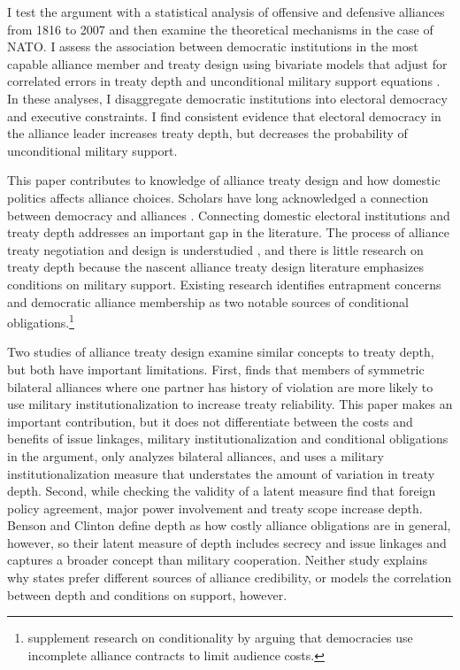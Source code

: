 \documentclass[12pt]{article}
\begin{document}
I test the argument with a statistical analysis of offensive and defensive alliances from 1816 to 2007 and then examine the theoretical mechanisms in the case of NATO.
I assess the association between democratic institutions in the most capable alliance member and treaty design using bivariate models that adjust for correlated errors in treaty depth and unconditional military support equations \citep{Braumoelleretal2018}. 
In these analyses, I disaggregate democratic institutions into electoral democracy and executive constraints.
I find consistent evidence that electoral democracy in the alliance leader increases treaty depth, but decreases the probability of unconditional military support. 


This paper contributes to knowledge of alliance treaty design and how domestic politics affects alliance choices.
Scholars have long acknowledged a connection between democracy and alliances \citep{LaiReiter2000, GiblerWolford2006, Mattes2012, Warren2016, McManusYarhi-Milo2017}. 
Connecting domestic electoral institutions and treaty depth addresses an important gap in the literature. 
The process of alliance treaty negotiation and design is understudied \citep{Poast2019a}, and there is little research on treaty depth because the nascent alliance treaty design literature emphasizes conditions on military support.
Existing research identifies entrapment concerns \citep{Kim2011, Benson2012} and democratic alliance membership \citep{Mattes2012, Chibaetal2015} as two notable sources of conditional obligations.\footnote{\citet{FjelstulReiter2019} supplement research on conditionality by arguing that democracies use incomplete alliance contracts to limit audience costs.} 


Two studies of alliance treaty design examine similar concepts to treaty depth, but both have important limitations.   
First, \citet{Mattes2012} finds that members of symmetric bilateral alliances where one partner has history of violation are more likely to use military institutionalization to increase treaty reliability. 
This paper makes an important contribution, but it does not differentiate between the costs and benefits of issue linkages, military institutionalization and conditional obligations in the argument, only analyzes bilateral alliances, and uses a military institutionalization measure \citep{LeedsAnac2005} that understates the amount of variation in treaty depth.  
Second, while checking the validity of a latent measure \citet{BensonClinton2016} find that foreign policy agreement, major power involvement and treaty scope increase depth. 
Benson and Clinton define depth as how costly alliance obligations are in general, however, so their latent measure of depth includes secrecy and issue linkages and captures a broader concept than military cooperation. 
Neither study explains why states prefer different sources of alliance credibility, or models the correlation between depth and conditions on support, however. 
\end{document}
